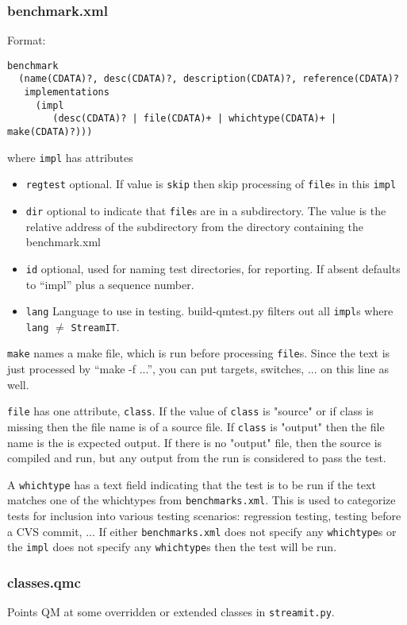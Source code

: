 \documentclass[11pt]{article}
\begin{document}
\subsubsection{benchmark.xml}
Format:\begin{verbatim}
benchmark 
  (name(CDATA)?, desc(CDATA)?, description(CDATA)?, reference(CDATA)?
   implementations 
     (impl
        (desc(CDATA)? | file(CDATA)+ | whichtype(CDATA)+ | make(CDATA)?)))
       \end{verbatim}%
where {\tt impl} has attributes
\begin{itemize}
\item {\tt regtest} optional.  If value is {\tt skip} then skip
  processing of {\tt file}s in this {\tt impl} 
\item {\tt dir} optional to indicate that {\tt file}s are in a subdirectory.
The value is the relative address of the subdirectory from the
directory containing the benchmark.xml
\item {\tt id} optional, used for naming test directories, for
  reporting.  If absent defaults to ``impl'' plus a sequence number.
\item {\tt lang} Language to use in testing.  build-qmtest.py filters
  out all {\tt impl}s where {\tt lang} $\neq$ {\tt StreamIT}.
\end{itemize}

{\tt make} names a make file, which is run before processing {\tt file}s.
Since the text is just processed by ``make -f ...'', you can put targets, 
switches, ... on this line as well.

{\tt file} has one attribute, {\tt class}.  If the value of {\tt class}
is "source" or if class is missing then the file name is of a source
file.  If {\tt class} is "output" then the file name is the is expected
output.  If there is no "output" file, then the source is compiled and
run, but any output from the run is considered to pass the test.

A {\tt whichtype} has a text field indicating that the test is to be run
if the text matches one of the whichtypes from {\tt benchmarks.xml}.
This is used to categorize tests for inclusion into various testing
scenarios: regression testing, testing before a CVS commit, ... 
If either {\tt benchmarks.xml} does not specify any {\tt whichtype}s
or the {\tt impl} does not specify any {\tt whichtype}s then the test
will be run.

\subsubsection{classes.qmc}
Points QM at some overridden or extended classes in {\tt streamit.py}.
\end{document}
